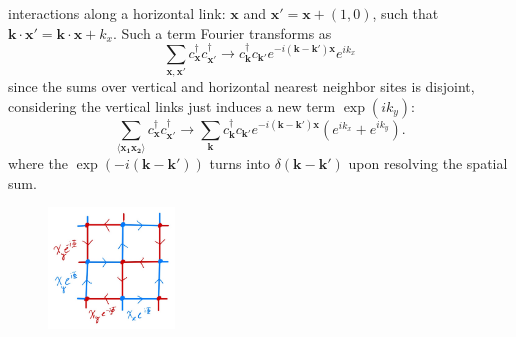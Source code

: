 \documentclass{report}
\begin{document}
interactions along a horizontal link: $ \mathbf{x} $ and $ \mathbf{x}' =
\mathbf{x} + (1,0) $, such that $ \mathbf{k}\cdot \mathbf{x}' =
\mathbf{k}\cdot\mathbf{x} + k_x $. Such a term Fourier transforms as 
\begin{equation*}
	\sum_{\mathbf{x}, \mathbf{x}'}c_\mathbf{x}^\dagger c_\mathbf{x'}^\dagger
	\rightarrow 
		c_\mathbf{k}^\dagger c_{\mathbf{k}'}
		e^{-i (\mathbf{k}-\mathbf{k}') \mathbf{x}} e^{ik_x}
\end{equation*}
since the sums over vertical and horizontal nearest neighbor sites is disjoint, 
considering the vertical links just induces a new term $ \exp(ik_y) $:
\begin{equation*}
	\sum_{\langle \mathbf{x_1} \mathbf{x_2}\rangle}c_\mathbf{x}^\dagger c_\mathbf{x'}^\dagger
	\rightarrow 
	\sum_{\mathbf{k}} 
	c_\mathbf{k}^\dagger c_{\mathbf{k}'}
	e^{-i (\mathbf{k}-\mathbf{k}') \mathbf{x}} (e^{ik_x} + e^{{ik_y}}).
\end{equation*}
where the $ \exp(-i(\mathbf{k} - \mathbf{k}')) $ turns into $ \delta(\mathbf{k}
- \mathbf{k}') $ upon resolving the spatial sum.
\begin{figure}[t]
	\centering
	\includegraphics[width=0.3\textwidth]{figs/november/bipartite-gauge.jpg}
	\caption{}
	\label{fig:heisenberg-qed3-bipartite}
\end{figure}
\end{document}
